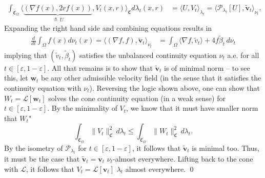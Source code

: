 \documentclass[11pt]{article}
\begin{document}
\begin{align*}
    \int_{\mathfrak{C}_\Omega} \Big\langle \underbrace{(\nabla f(x), 2rf(x))}_{\triangleq\, U},  V_t(x,r) \Big\rangle_\mathfrak{C} d\lambda_t(x,r) &= \Big\langle U, V_t \Big\rangle_{\lambda_t}= \langle \mathcal{P}_{\lambda_t}[U], \tilde{\mathbf{v}}_t\rangle_{\nu_t}. 
\end{align*}
Expanding the right hand side and combining equations results in 
\begin{align*}
    \frac{d}{dt}\int_{\Omega}f(x)d\nu_t(x) = \Big\langle \left( \nabla f, f \right) , \tilde{\mathbf{v}}_t\Big\rangle_{\nu_t} &= \int_\Omega \langle \nabla f, \tilde v_t\rangle + 4f\tilde\beta_t \, d\nu_t
\end{align*}
implying that $(\tilde v_t, \tilde \beta_t)$ satisfies the unbalanced continuity equation $\nu_t$ a.e. for all $t \in [\varepsilon, 1- \varepsilon]$. All that remains is to show that $\tilde{\mathbf{v}}_t$ is of minimal norm -- to see this, let $\mathbf{w}_t$ be any other admissible velocity field (in the sense that it satisfies the continuity equation with $\nu_t$). Reversing the logic shown above, one can show that $W_t  = \mathcal{L}[\mathbf{w}_t]$ solves the cone continuity equation (in a weak sense) for $t \in [\varepsilon, 1-\varepsilon]$. By the minimality of $V_t$, we know that it must have smaller norm that $W_t$"
\[\int_{\mathfrak{C}_\Omega}\|V_t\|^2_\mathfrak{C}\, d\lambda_t \leq \int_{\mathfrak{C}_\Omega}\|W_t\|_{\mathfrak{C}}^2\, d\lambda_t.\]
By the isometry of $\mathcal{P}_{\lambda_t}$ for $t \in [\varepsilon, 1 - \varepsilon]$, it follows that $\tilde{\mathbf{v}}_t$ is minimal too. Thus, it must be the case that $\tilde{\mathbf{v}}_t = \mathbf{v}_t$ $\nu_t$-almost everywhere. Lifting back to the cone with $\mathcal{L}$, it follows that $V_t = \mathcal{L}[\mathbf{v}_t]$ $\lambda_t$ almost everywhere.
\qed{}



{}
\end{document}
